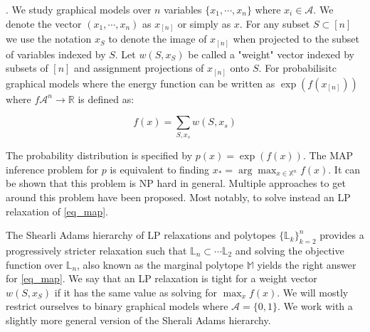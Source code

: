 \cite{rowland2017conditions}. We study graphical models over $n$ variables $\{x_1, \cdots, x_n\}$ where $x_i \in \mathcal{A}$. We denote the vector $(x_1, \cdots, x_n)$ as  $x_{[n]}$ or simply as $x$. For any subset $S \subset [n]$ we use the notation $x_S$ to denote the image of $x_{[n]}$ when projected to the subset of variables indexed by $S$. Let $w(S, x_S)$ be  called a "weight" vector indexed by subsets of $[n]$ and assignment projections of $x_{[n]}$ onto $S$. For probabilisitc graphical models where the energy function can be written as $\exp( f(x_{[n]}))$ where $f \mathcal{A}^n \rightarrow \mathbb{R}$ is defined as:

\begin{equation}\label{eq_map}
f(x) = \sum_{S, x_s} w(S, x_s)
\end{equation}

The probability distribution is specified by $p(x) = \exp(f(x))$. The MAP inference problem for $p$ is equivalent to finding $x_* = \arg\max_{x \in \mathbb{X}^n} f(x)$. It can be shown that this problem is NP hard in general. Multiple approaches to get around this problem have been proposed. Most notably, to solve instead an LP relaxation of \ref{eq_map}. 

The Shearli Adams hierarchy of LP relaxations and polytopes $\{\mathbb{L}_k\}_{k=2}^n$ provides a progressively stricter relaxation  such that $\mathbb{L}_n \subset \cdots \mathbb{L}_2$ and solving the objective function over $\mathbb{L}_n$, also known as the marginal polytope $\mathbb{M}$ yields the right answer for \ref{eq_map}. We say that an LP relaxation is tight for a weight vector $w(S, x_S)$ if it has the same value as solving for $\max_{x} f(x)$. We will mostly restrict ourselves to binary graphical models where $\mathcal{A} = \{0,1\}$. We work with a slightly more general version of the Sherali Adams hierarchy. 



